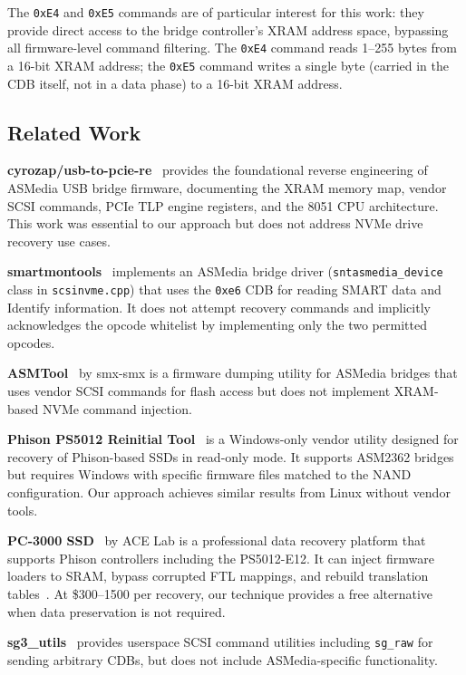 \documentclass[conference]{IEEEtran}
\begin{document}
The \texttt{0xE4} and \texttt{0xE5} commands are of particular interest
for this work: they provide direct access to the bridge controller's
XRAM address space, bypassing all firmware-level command filtering. The
\texttt{0xE4} command reads 1--255 bytes from a 16-bit XRAM address; the
\texttt{0xE5} command writes a single byte (carried in the CDB itself,
not in a data phase) to a 16-bit XRAM address.


\subsection{Related Work}
\label{sec:related}

\textbf{cyrozap/usb-to-pcie-re}~\cite{cyrozap-usb-pcie} provides the
foundational reverse engineering of ASMedia USB bridge firmware,
documenting the XRAM memory map, vendor SCSI commands, PCIe TLP engine
registers, and the 8051 CPU architecture. This work was essential to our
approach but does not address NVMe drive recovery use cases.

\textbf{smartmontools}~\cite{smartmontools} implements an ASMedia bridge
driver (\texttt{sntasmedia\_device} class in \texttt{scsinvme.cpp}) that
uses the \texttt{0xe6} CDB for reading SMART data and Identify
information. It does not attempt recovery commands and implicitly
acknowledges the opcode whitelist by implementing only the two permitted
opcodes.

\textbf{ASMTool}~\cite{asmtool} by smx-smx is a firmware dumping
utility for ASMedia bridges that uses vendor SCSI commands for flash
access but does not implement XRAM-based NVMe command injection.

\textbf{Phison PS5012 Reinitial Tool}~\cite{phison-reinitial} is a
Windows-only vendor utility designed for recovery of Phison-based SSDs
in read-only mode. It supports ASM2362 bridges but requires Windows
with specific firmware files matched to the NAND configuration. Our
approach achieves similar results from Linux without vendor tools.

\textbf{PC-3000 SSD}~\cite{acelab-phison} by ACE Lab is a professional
data recovery platform that supports Phison controllers including the
PS5012-E12. It can inject firmware loaders to SRAM, bypass corrupted
FTL mappings, and rebuild translation tables~\cite{rossmann-ssd}. At
\$300--1500 per recovery, our technique provides a free alternative when
data preservation is not required.

\textbf{sg3\_utils}~\cite{sg3-utils} provides userspace SCSI command
utilities including \texttt{sg\_raw} for sending arbitrary CDBs, but
does not include ASMedia-specific functionality.
\end{document}
